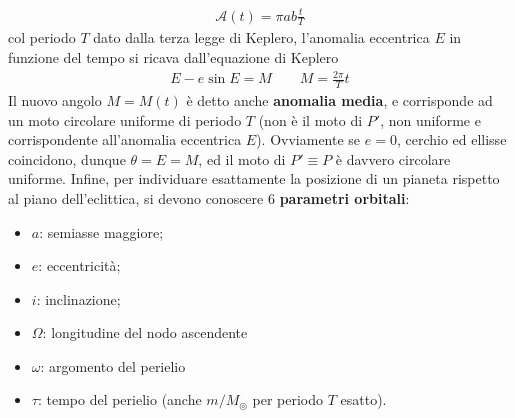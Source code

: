 \documentclass[a4paper, oneside]{book}
\begin{document}
\begin{gather*}
    \mathcal{A}(t) = \pi a b \frac{t}{T}
\end{gather*}
col periodo $T$ dato dalla terza legge di Keplero, l'anomalia 
eccentrica $E$ in funzione del tempo si ricava dall'equazione 
di Keplero 
\begin{align}
    \boxed{E - e\sin E = M \qquad M = \frac{2\pi}{T}t}
\end{align}
Il nuovo angolo $M = M(t)$ è detto anche \textbf{anomalia media}, e corrisponde ad un 
moto circolare uniforme di periodo $T$ (non è il moto di $P'$, 
non uniforme e corrispondente all'anomalia eccentrica $E$). Ovviamente 
se $e = 0$, cerchio ed ellisse coincidono, dunque $\theta = E = M$, 
ed il moto di $P' \equiv P$ è davvero circolare uniforme.
Infine, per individuare esattamente la posizione di un pianeta rispetto al piano 
dell'eclittica, si devono conoscere 6 \textbf{parametri orbitali}: 
\begin{itemize}
    \item $a$: semiasse maggiore; 
    \item $e$: eccentricità;
    \item $i$: inclinazione;
    \item $\Omega$: longitudine del nodo ascendente
    \item $\omega$: argomento del perielio
    \item $\tau$: tempo del perielio (anche $m/M_{\circledcirc}$ per periodo $T$ esatto). 
\end{itemize}
\end{document}
